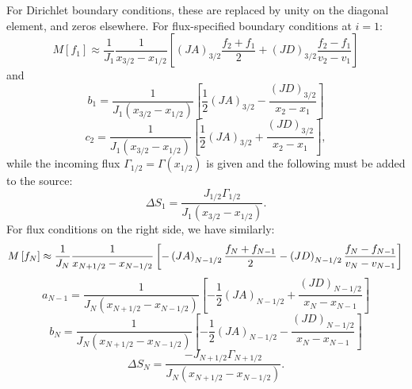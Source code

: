 \documentclass[12pt]{article}
\begin{document}
For Dirichlet boundary conditions, these are replaced by unity on the diagonal element, and zeros elsewhere. For flux-specified boundary conditions at $i=1$:
\begin{equation}
   M\left[ f_1 \right] \approx \frac{1}{J_1} \frac{1}{x_{3/2} - x_{1/2}} \left[ \left(JA\right)_{3/2} \frac{f_{2} + f_1 }{2}  + \left(JD \right)_{3/2}\frac{ f_{2} - f_1 }{v_{2}-v_1}   \right]  
\end{equation}
and
\begin{equation}
   b_{1} = \frac{1}{J_1 \left( x_{3/2} - x_{1/2} \right)} \left[ \frac{1}{2}\left(JA\right)_{3/2} - \frac{\left(JD\right)_{3/2} }{ x_{2}-x_1} \right]
\end{equation}
\begin{equation}
   c_{2} = \frac{1}{J_1 \left( x_{3/2} - x_{1/2} \right)} \left[ \frac{1}{2}\left(JA\right)_{3/2} + \frac{\left(JD\right)_{3/2} }{ x_{2}-x_1} \right],
\end{equation}
while the incoming flux $\Gamma_{1/2} = \Gamma\left(x_{1/2}\right)$ is given and the following must be added to the source:
\begin{equation}
   \Delta S_1  = \frac{J_{1/2} \Gamma_{1/2}}{J_1 \left( x_{3/2} - x_{1/2} \right)}.
\end{equation}
For flux conditions on the right side, we have similarly:
\begin{equation}
   M\left[ f_N \right] \approx \frac{1}{J_N} \frac{1}{x_{N+1/2} - x_{N-1/2}} \left[ -  \left(JA\right)_{N-1/2} \frac{ f_{N} + f_{N-1} }{2}  - \left(JD \right)_{N-1/2} \frac{ f_{N} - f_{N-1} }{v_{N}-v_{N-1}}  \right]  \\
\end{equation}
\begin{equation}
   a_{N-1} = \frac{1}{J_N \left( x_{N+1/2} - x_{N-1/2} \right)} \left[- \frac{1}{2}\left(JA\right)_{N-1/2} + \frac{\left(JD\right)_{N-1/2} }{ x_{N}-x_{N-1}} \right]
\end{equation}
\begin{equation}
   b_{N} = \frac{1}{J_N \left( x_{N+1/2} - x_{N-1/2} \right)} \left[ - \frac{1}{2}\left(JA\right)_{N-1/2} - \frac{\left(JD\right)_{N-1/2} }{ x_{N}-x_{N-1}} \right]
\end{equation}
\begin{equation}
   \Delta S_N  = \frac{- J_{N+1/2} \Gamma_{N+1/2}}{J_N \left( x_{N+1/2} - x_{N-1/2} \right)}.
\end{equation}
\end{document}
